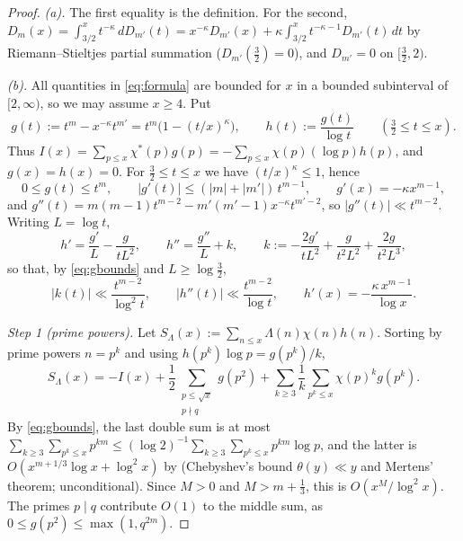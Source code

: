 \documentclass[11pt]{amsart}
\theoremstyle{definition}
\numberwithin{equation}{section}
\begin{document}
\begin{proof}
\emph{(a).} The first equality is the definition. For the second,
$D_m(x)=\int_{3/2}^xt^{-\kappa}\,dD_{m'}(t)
=x^{-\kappa}D_{m'}(x)+\kappa\int_{3/2}^xt^{-\kappa-1}D_{m'}(t)\,dt$ by
Riemann--Stieltjes partial summation ($D_{m'}(\tfrac32)=0$), and
$D_{m'}=0$ on $[\tfrac32,2)$.

\emph{(b).} All quantities in \eqref{eq:formula} are bounded for $x$
in a bounded subinterval of $[2,\infty)$, so we may assume $x\ge4$.
Put
\[
g(t):=t^m-x^{-\kappa}t^{m'}=t^m\bigl(1-(t/x)^\kappa\bigr),
\qquad
h(t):=\frac{g(t)}{\log t}\qquad(\tfrac32\le t\le x).
\]
Thus $I(x)=\sum_{p\le x}\chi^*(p)g(p)=-\sum_{p\le x}\chi(p)(\log p)h(p)$,
and $g(x)=h(x)=0$. For $\tfrac32\le t\le x$ we have $(t/x)^\kappa\le1$,
hence
\begin{equation}\label{eq:gbounds}
0\le g(t)\le t^m,\qquad |g'(t)|\le(|m|+|m'|)\,t^{m-1},\qquad
g'(x)=-\kappa x^{m-1},
\end{equation}
and $g''(t)=m(m-1)t^{m-2}-m'(m'-1)x^{-\kappa}t^{m'-2}$, so
$|g''(t)|\ll t^{m-2}$. Writing $L=\log t$,
\begin{equation}\label{eq:hderivs}
h'=\frac{g'}{L}-\frac{g}{tL^2},\qquad
h''=\frac{g''}{L}+k,\qquad
k:=-\frac{2g'}{tL^2}+\frac{g}{t^2L^2}+\frac{2g}{t^2L^3},
\end{equation}
so that, by \eqref{eq:gbounds} and $L\ge\log\tfrac32$,
\begin{equation}\label{eq:hbounds}
|k(t)|\ll\frac{t^{m-2}}{\log^2t},\qquad
|h''(t)|\ll\frac{t^{m-2}}{\log t},\qquad
h'(x)=-\frac{\kappa\,x^{m-1}}{\log x}.
\end{equation}

\emph{Step 1 (prime powers).} Let
$S_\Lambda(x):=\sum_{n\le x}\Lambda(n)\chi(n)h(n)$. Sorting by prime
powers $n=p^k$ and using $h(p^k)\log p=g(p^k)/k$,
\begin{equation}\label{eq:SLsplit}
S_\Lambda(x)=-I(x)+\frac12\sum_{\substack{p\le\sqrt x\\ p\nmid q}}g(p^2)
+\sum_{k\ge3}\frac1k\sum_{p^k\le x}\chi(p)^kg(p^k).
\end{equation}
By \eqref{eq:gbounds}, the last double sum is at most
$\sum_{k\ge3}\sum_{p^k\le x}p^{km}
\le(\log2)^{-1}\sum_{k\ge3}\sum_{p^k\le x}p^{km}\log p$, and the
latter is $O(x^{m+1/3}\log x+\log^2x)$ by \cite[proof of Lemma~3,
``the $k\ge3$ terms'']{WR} (Chebyshev's bound $\theta(y)\ll y$ and
Mertens' theorem; unconditional). Since $M>0$ and $M>m+\tfrac13$, this
is $O(x^M/\log^2x)$. The primes $p\mid q$ contribute
$O(1)$ to the middle sum, as $0\le g(p^2)\le\max(1,q^{2m})$.


\end{proof}
\end{document}
